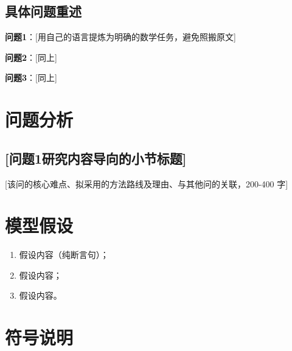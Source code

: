 \documentclass[12pt,a4paper]{ctexart}
\begin{document}
\subsection{具体问题重述}

\textbf{问题1}：[用自己的语言提炼为明确的数学任务，避免照搬原文]

\textbf{问题2}：[同上]

\textbf{问题3}：[同上]

\section{问题分析}


\subsection{[问题1研究内容导向的小节标题]}

[该问的核心难点、拟采用的方法路线及理由、与其他问的关联，200-400 字]

\section{模型假设}

\begin{enumerate}[label=\arabic*., leftmargin=2em]
    \item 假设内容（纯断言句）；
    \item 假设内容；
    \item 假设内容。
\end{enumerate}

\section{符号说明}
\end{document}
